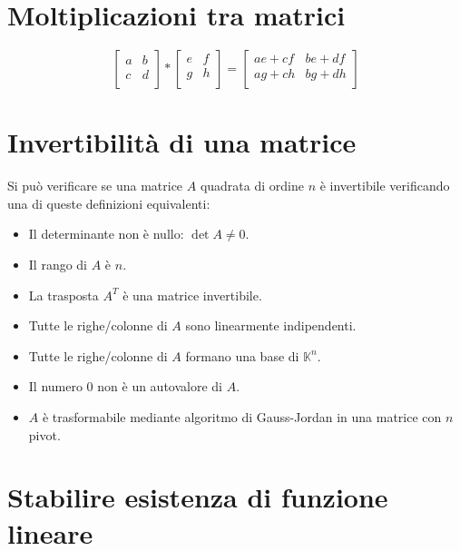 \documentclass{article}
\begin{document}
\section{Moltiplicazioni tra matrici}

\[
    \begin{bmatrix}
        a & b \\
        c & d \\
    \end{bmatrix}
    * 
    \begin{bmatrix}
        e & f \\
        g & h \\
    \end{bmatrix}
    =
    \begin{bmatrix}
        ae + cf & be + df \\
        ag + ch & bg + dh \\
    \end{bmatrix}
\]

\section{Invertibilità di una matrice}

Si può verificare se una matrice \( A \) quadrata di ordine \( n \) è invertibile verificando una di queste definizioni equivalenti:

\begin{itemize}
\item Il determinante non è nullo: \( \det A\neq 0 \).
\item Il rango di \( A \) è \( n \).
\item La trasposta \( A^{T} \) è una matrice invertibile.
\item Tutte le righe/colonne di \( A \) sono linearmente indipendenti.
\item Tutte le righe/colonne di \( A \) formano una base di \( \mathbb{K} ^{n} \).
\item Il numero 0 non è un autovalore di \( A \).
\item \( A \) è trasformabile mediante algoritmo di Gauss-Jordan in una matrice con \( n \) pivot.
\end{itemize}

\section{Stabilire esistenza di funzione lineare}
\end{document}
